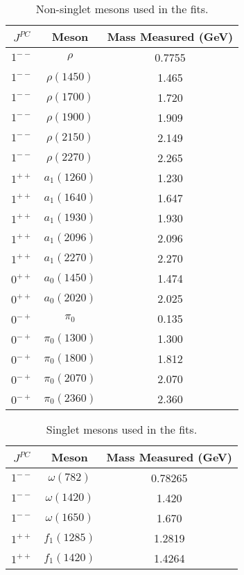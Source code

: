 \documentclass[a4paper,12pt]{article}
\begin{document}
\begin{table}
\centering
\begin{tabular}{ | c | c | c | }

\hline
$J^{PC}$ & Meson & Mass Measured (GeV) \\
\hline
$1^{--}$ & $\rho$ & 0.7755 \\
\hline
$1^{--}$ &  $\rho(1450)$ & 1.465 \\
\hline
$1^{--}$ & $\rho(1700)$ & 1.720 \\
\hline
$1^{--}$ & $\rho(1900)$ & 1.909 \\
\hline
$1^{--}$ & $\rho(2150)$ & 2.149 \\
\hline
$1^{--}$ & $\rho(2270)$ & 2.265\\
\hline
$1^{++}$ & $a_1(1260)$ & 1.230\\
\hline
$1^{++}$ & $a_1(1640)$ & 1.647 \\
\hline
$1^{++}$ & $a_1(1930)$ & 1.930 \\
\hline
$1^{++}$ & $a_1(2096)$ & 2.096 \\
\hline
$1^{++}$ & $a_1(2270)$ & 2.270 \\
\hline
$0^{++}$ &  $a_0(1450)$ & 1.474 \\
\hline
$0^{++}$ &  $a_0(2020)$ & 2.025 \\
\hline
$0^{-+}$ &  $\pi_0$ & 0.135 \\
\hline
$0^{-+}$ &  $\pi_0(1300)$ & 1.300 \\
\hline
$0^{-+}$ &  $\pi_0(1800)$ & 1.812 \\
\hline
$0^{-+}$ &  $\pi_0(2070)$ & 2.070 \\
\hline
$0^{-+}$ &  $\pi_0(2360)$ & 2.360 \\
\hline
\end{tabular}
\caption{Non-singlet mesons used in the fits.}
\label{table: ns mesons} 
\end{table}

\begin{table}
\centering
\begin{tabular}{ | c | c | c | }

\hline
$J^{PC}$ & Meson & Mass Measured (GeV) \\
\hline
$1^{--}$ & $\omega(782)$ & 0.78265 \\
\hline
$1^{--}$ &  $\omega(1420)$ & 1.420\\
\hline
$1^{--}$ & $\omega(1650)$ & 1.670 \\
\hline
$1^{++}$ & $f_1(1285)$ & 1.2819\\
\hline
$1^{++}$ & $f_1(1420)$ & 1.4264 \\
\hline
\end{tabular}
\caption{Singlet mesons used in the fits.}
\label{table: s mesons} 
\end{table}
\end{document}
